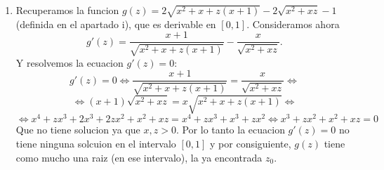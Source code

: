 \documentclass{article}
\begin{document}
\begin{enumerate}
\begin{enumerate}
\begin{enumerate}
\item Recuperamos la funcion $g(z) = 2\sqrt{x^2+x + z(x+1)} - 2\sqrt{x^2+xz} - 1$ (definida en el
apartado i), que es derivable en $[0,1]$. Consideramos ahora
\[
g'(z) = \frac{x+1}{\sqrt{x^2+x+z(x+1)}} - \frac{x}{\sqrt{x^2+xz}}.
\]
Y resolvemos la ecuacion $g'(z) = 0$:
\[
g'(z) = 0 \iff \frac{x+1}{\sqrt{x^2+x+z(x+1)}} = \frac{x}{\sqrt{x^2+xz}} \iff
\]
\[
\iff
(x+1)\sqrt{x^2+xz} = x\sqrt{x^2+x+z(x+1)} \iff
\]
\[
\iff
x^4 + zx^3 + 2x^3 + 2zx^2 + x^2 +xz = x^4 +zx^3+x^3+zx^2
\iff
x^3 + zx^2 + x^2 +xz = 0
\]
Que no tiene solucion ya que $x,z>0$. Por lo tanto la ecuacion $g'(z) = 0$ no tiene ninguna
solcuion en el intervalo $[0,1]$  y por consiguiente, $g(z)$ tiene como mucho una raiz (en ese
intervalo), la ya encontrada $z_0$.
\end{enumerate}
\end{enumerate}
\end{enumerate}
\end{document}

